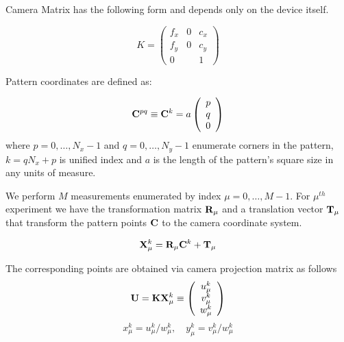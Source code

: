 \documentclass[a4paper,10pt]{article}
\title{}
\author{}
\begin{document}
\maketitle

\begin{abstract}

\end{abstract}

\section{}

Camera Matrix has the following form and depends only on the device itself.

\begin{equation}
 K=\left(\begin{array}{ccc}
          f_x & 0 & c_x \\
          f_y & 0 & c_y \\
          0 & & 1
         \end{array}
\right)
\end{equation}

Pattern coordinates are defined as:

\begin{equation}
 {\bf C}^{pq}\equiv {\bf C}^k= a\left(\begin{array}{c}
                  p \\
                  q \\
                  0
                 \end{array}
\right)
\end{equation}
where $p=0,\ldots, N_x-1$ and $q=0,\ldots,N_y-1$ enumerate corners in the pattern, $k = qN_x + p$ is unified index and $a$ is the length of the pattern's square size in any units of measure.


We perform $M$ measurements enumerated by index $\mu = 0,\ldots, M-1$. For $\mu^{th}$ experiment we have the transformation matrix ${\bf R}_\mu$ and a translation vector ${\bf T}_\mu$ that transform the pattern points ${\bf C}$ to the camera coordinate system.

\begin{equation}
 {\bf X}^k_\mu = {\bf R}_\mu {\bf C}^k+ {\bf T}_\mu
\end{equation}

The corresponding points are obtained via camera projection matrix as follows
{
\begin{equation}
 {\bf U} = 
 {\bf K} {\bf X}^{k}_\mu \equiv \left(\begin{array}{c}
  u^{k}_\mu \\ v^{k}_\mu \\ w^{k}_\mu
 \end{array}\right)
\end{equation}
}
\begin{equation}
 x^{k}_\mu = u^{k}_\mu / w^{k}_\mu, \quad y^{k}_\mu = v^{k}_\mu / w^{k}_\mu
\end{equation}
\end{document}
